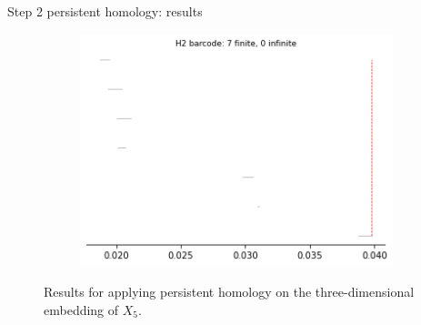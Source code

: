 \documentclass[xcolor={dvipsnames,svgnames}]{beamer}
\begin{document}
\begin{frame}{Step 2 persistent homology: results}
\begin{figure}[H]
\begin{subfigure}[b]{0.2\textwidth}
\includegraphics[width=\textwidth]{figures/X5_H2_barcode.png}
 \caption{}
\end{subfigure}
\caption{Results for applying persistent homology on the three-dimensional embedding of $X_5$.}
\end{figure}
\end{frame}
\end{document}
